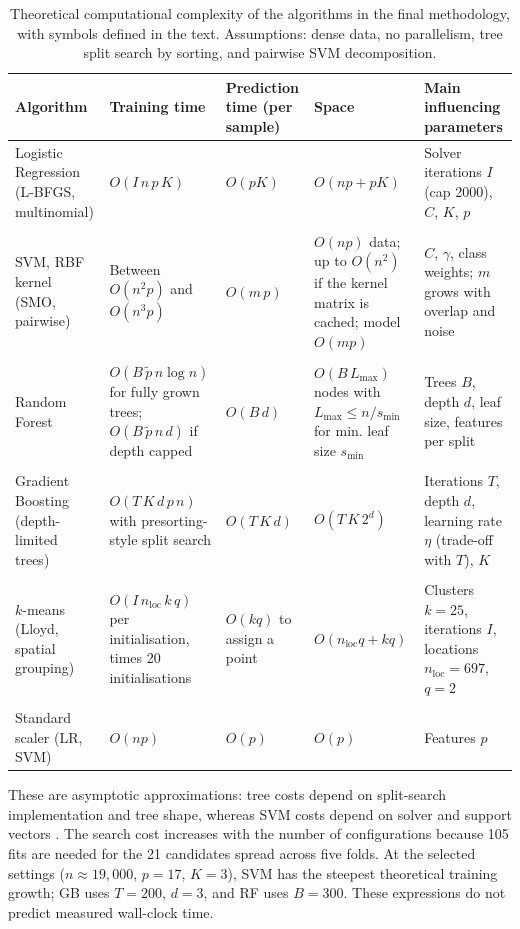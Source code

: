 \documentclass[conference]{IEEEtran}
\begin{document}
\begin{table}[t]
\caption{Theoretical computational complexity of the algorithms in the final methodology, with symbols defined in the text. Assumptions: dense data, no parallelism, tree split search by sorting, and pairwise SVM decomposition.}
\label{tab:complexity}
\centering
\footnotesize
\setlength{\tabcolsep}{3pt}
\begin{tabular}{p{}p{}p{}p{}p{}}
\toprule
Algorithm & Training time & Prediction time (per sample) & Space & Main influencing parameters\\
\midrule
Logistic Regression (L-BFGS, multinomial) & $O(I\,n\,p\,K)$ & $O(pK)$ & $O(np+pK)$ & Solver iterations $I$ (cap 2000), $C$, $K$, $p$\\\\
SVM, RBF kernel (SMO, pairwise) & Between $O(n^{2}p)$ and $O(n^{3}p)$ & $O(m\,p)$ & $O(np)$ data; up to $O(n^{2})$ if the kernel matrix is cached; model $O(mp)$ & $C$, $\gamma$, class weights; $m$ grows with overlap and noise\\\\
Random Forest & $O\!\left(B\,\tilde p\,n\log n\right)$ for fully grown trees; $O(B\,\tilde p\,n\,d)$ if depth capped & $O(B\,d)$ & $O(B\,L_{\max})$ nodes with $L_{\max}\le n/s_{\min}$ for min. leaf size $s_{\min}$ & Trees $B$, depth $d$, leaf size, features per split\\\\
Gradient Boosting (depth-limited trees) & $O\!\left(T\,K\,d\,p\,n\right)$ with presorting-style split search & $O(T\,K\,d)$ & $O(T\,K\,2^{d})$ & Iterations $T$, depth $d$, learning rate $\eta$ (trade-off with $T$), $K$\\\\
$k$-means (Lloyd, spatial grouping) & $O(I\,n_{\text{loc}}\,k\,q)$ per initialisation, times 20 initialisations & $O(kq)$ to assign a point & $O(n_{\text{loc}}q+kq)$ & Clusters $k=25$, iterations $I$, locations $n_{\text{loc}}=697$, $q=2$\\\\
Standard scaler (LR, SVM) & $O(np)$ & $O(p)$ & $O(p)$ & Features $p$\\
\bottomrule
\end{tabular}
\end{table}

These are asymptotic approximations: tree costs depend on split-search implementation and tree shape, whereas SVM costs depend on solver and support vectors \cite{chang2011}. The search cost increases with the number of configurations because 105 fits are needed for the 21 candidates spread across five folds. At the selected settings ($n\approx19{,}000$, $p=17$, $K=3$), SVM has the steepest theoretical training growth; GB uses $T=200$, $d=3$, and RF uses $B=300$. These expressions do not predict measured wall-clock time.
\end{document}
